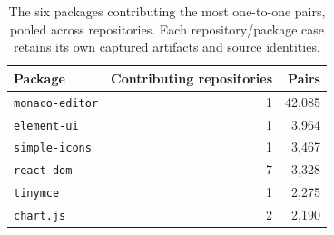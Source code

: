 \begin{table}[htbp]
\caption{The six packages contributing the most one-to-one pairs, pooled across repositories. Each repository/package case retains its own captured artifacts and source identities.}
\label{tab:collection-libraries}
\centering\small
\begin{tabular}{@{}lrr@{}}
\toprule
Package & Contributing repositories & Pairs\\
\midrule
\nolinkurl{monaco-editor} & 1 & 42,085\\
\nolinkurl{element-ui} & 1 & 3,964\\
\nolinkurl{simple-icons} & 1 & 3,467\\
\nolinkurl{react-dom} & 7 & 3,328\\
\nolinkurl{tinymce} & 1 & 2,275\\
\nolinkurl{chart.js} & 2 & 2,190\\
\bottomrule
\end{tabular}
\end{table}
